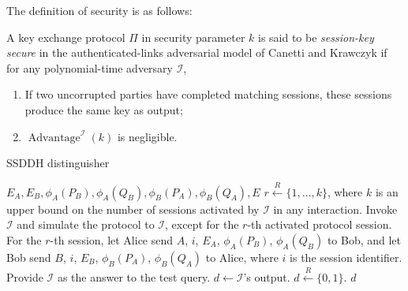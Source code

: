 The definition of security is as follows:

\begin{definition}\label{sidh:def:kep}
A key exchange protocol $\Pi$ in security parameter $k$ is said to be
\emph{session-key secure} in the authenticated-links adversarial model
of Canetti and Krawczyk if for any polynomial-time adversary $\mathcal{I}$,
\begin{enumerate}
\item If two uncorrupted parties have completed matching sessions,
  these sessions produce the same key as output;
\item $\operatorname{Advantage}^{\mathcal{I}}(k)$ is negligible.
\end{enumerate}
\end{definition}

\begin{algorithm}[t]
\caption{SSDDH distinguisher}
\label{sidh:alg:distinguisher}
\begin{algorithmic}[1]
\REQUIRE $E_A, E_B, \phi_A(P_B), \phi_A(Q_B), \phi_B(P_A),
\phi_B(Q_A), E$
\STATE $r \stackrel{R}{\leftarrow} \{1,\ldots,k\}$, where $k$ is an
upper bound on the number of sessions activated by $\mathcal{I}$ in any
interaction.
\STATE Invoke $\mathcal{I}$ and simulate the protocol to $\mathcal{I}$, except for the
$r$-th activated protocol session.
\STATE For the $r$-th session, let Alice send $A$, $i$, $E_A$, $\phi_A(P_B)$,
$\phi_A(Q_B)$ to Bob, and let Bob send $B$, $i$, $E_B$, $\phi_B(P_A)$,
$\phi_B(Q_A)$ to Alice, where $i$ is the session identifier.
\STATE Provide $\mathcal{I}$ as the answer to the test query.
\STATE $d \leftarrow \mathcal{I}$'s output.
\ELSE
\STATE $d \stackrel{R}{\leftarrow}\{0,1\}$.
\ENDIF
\ENSURE $d$

\end{algorithmic}
\end{algorithm}

